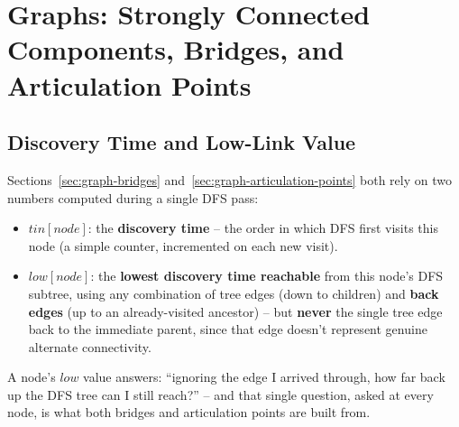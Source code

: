 \chapter{Graphs: Strongly Connected Components, Bridges, and Articulation Points}

\section{Discovery Time and Low-Link Value}
\label{sec:graph-others-intro}

Sections~\ref{sec:graph-bridges} and~\ref{sec:graph-articulation-points}
both rely on two numbers computed during a single DFS pass:

\begin{ideabox}
\begin{itemize}
  \item $\textit{tin}[\textit{node}]$: the \textbf{discovery time} --
        the order in which DFS first visits this node (a simple
        counter, incremented on each new visit).
  \item $\textit{low}[\textit{node}]$: the \textbf{lowest discovery
        time reachable} from this node's DFS subtree, using any
        combination of tree edges (down to children) and \textbf{back
        edges} (up to an already-visited ancestor) -- but
        \textbf{never} the single tree edge back to the immediate
        parent, since that edge doesn't represent genuine alternate
        connectivity.
\end{itemize}
A node's $\textit{low}$ value answers: ``ignoring the edge I arrived
through, how far back up the DFS tree can I still reach?'' -- and that
single question, asked at every node, is what both bridges and
articulation points are built from.
\end{ideabox}


